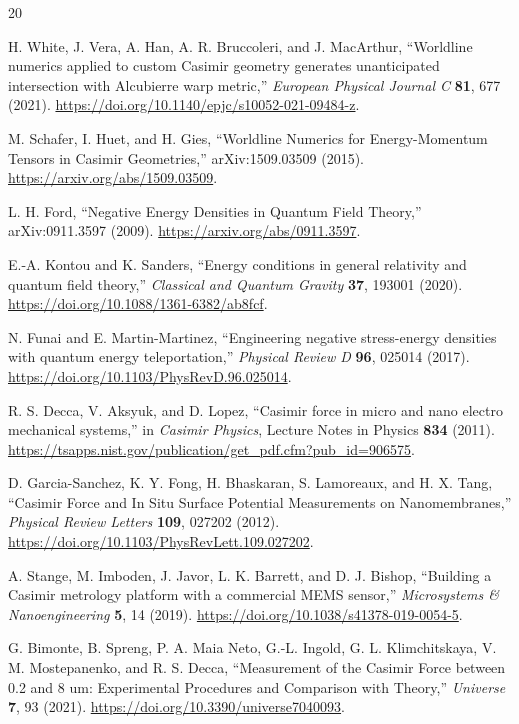 \documentclass[11pt]{article}
\begin{document}
\begingroup
\raggedright
\begin{thebibliography}{20}

H. White, J. Vera, A. Han, A. R. Bruccoleri, and J. MacArthur,
``Worldline numerics applied to custom Casimir geometry generates
unanticipated intersection with Alcubierre warp metric,''
\emph{European Physical Journal C} \textbf{81}, 677 (2021).
\url{https://doi.org/10.1140/epjc/s10052-021-09484-z}.

M. Schafer, I. Huet, and H. Gies,
``Worldline Numerics for Energy-Momentum Tensors in Casimir Geometries,''
arXiv:1509.03509 (2015).
\url{https://arxiv.org/abs/1509.03509}.

L. H. Ford,
``Negative Energy Densities in Quantum Field Theory,''
arXiv:0911.3597 (2009).
\url{https://arxiv.org/abs/0911.3597}.

E.-A. Kontou and K. Sanders,
``Energy conditions in general relativity and quantum field theory,''
\emph{Classical and Quantum Gravity} \textbf{37}, 193001 (2020).
\url{https://doi.org/10.1088/1361-6382/ab8fcf}.

N. Funai and E. Martin-Martinez,
``Engineering negative stress-energy densities with quantum energy
teleportation,''
\emph{Physical Review D} \textbf{96}, 025014 (2017).
\url{https://doi.org/10.1103/PhysRevD.96.025014}.

R. S. Decca, V. Aksyuk, and D. Lopez,
``Casimir force in micro and nano electro mechanical systems,''
in \emph{Casimir Physics}, Lecture Notes in Physics \textbf{834} (2011).
\url{https://tsapps.nist.gov/publication/get_pdf.cfm?pub_id=906575}.

D. Garcia-Sanchez, K. Y. Fong, H. Bhaskaran, S. Lamoreaux, and H. X. Tang,
``Casimir Force and In Situ Surface Potential Measurements on
Nanomembranes,''
\emph{Physical Review Letters} \textbf{109}, 027202 (2012).
\url{https://doi.org/10.1103/PhysRevLett.109.027202}.

A. Stange, M. Imboden, J. Javor, L. K. Barrett, and D. J. Bishop,
``Building a Casimir metrology platform with a commercial MEMS sensor,''
\emph{Microsystems \& Nanoengineering} \textbf{5}, 14 (2019).
\url{https://doi.org/10.1038/s41378-019-0054-5}.

G. Bimonte, B. Spreng, P. A. Maia Neto, G.-L. Ingold,
G. L. Klimchitskaya, V. M. Mostepanenko, and R. S. Decca,
``Measurement of the Casimir Force between 0.2 and 8 um: Experimental
Procedures and Comparison with Theory,''
\emph{Universe} \textbf{7}, 93 (2021).
\url{https://doi.org/10.3390/universe7040093}.


\end{thebibliography}
\end{document}
